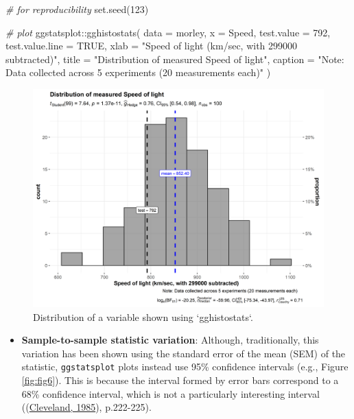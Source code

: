\documentclass[
]{article}
\newenvironment{Shaded}{\begin{snugshade}}{\end{snugshade}}
\newcommand{\AttributeTok}[1]{\textcolor[rgb]{0.77,0.63,0.00}{#1}}
\newcommand{\CommentTok}[1]{\textcolor[rgb]{0.56,0.35,0.01}{\textit{#1}}}
\newcommand{\ConstantTok}[1]{\textcolor[rgb]{0.00,0.00,0.00}{#1}}
\newcommand{\DecValTok}[1]{\textcolor[rgb]{0.00,0.00,0.81}{#1}}
\newcommand{\FunctionTok}[1]{\textcolor[rgb]{0.00,0.00,0.00}{#1}}
\newcommand{\NormalTok}[1]{#1}
\newcommand{\SpecialCharTok}[1]{\textcolor[rgb]{0.00,0.00,0.00}{#1}}
\newcommand{\StringTok}[1]{\textcolor[rgb]{0.31,0.60,0.02}{#1}}
\providecommand{\tightlist}{%
  \setlength{\itemsep}{0pt}\setlength{\parskip}{0pt}}
\begin{document}
\begin{Shaded}
\begin{Highlighting}[]
\CommentTok{\# for reproducibility}
\FunctionTok{set.seed}\NormalTok{(}\DecValTok{123}\NormalTok{)}

\CommentTok{\# plot}
\NormalTok{ggstatsplot}\SpecialCharTok{::}\FunctionTok{gghistostats}\NormalTok{(}
  \AttributeTok{data =}\NormalTok{ morley,}
  \AttributeTok{x =}\NormalTok{ Speed,}
  \AttributeTok{test.value =} \DecValTok{792}\NormalTok{,}
  \AttributeTok{test.value.line =} \ConstantTok{TRUE}\NormalTok{,}
  \AttributeTok{xlab =} \StringTok{"Speed of light (km/sec, with 299000 subtracted)"}\NormalTok{,}
  \AttributeTok{title =} \StringTok{"Distribution of measured Speed of light"}\NormalTok{,}
  \AttributeTok{caption =} \StringTok{"Note: Data collected across 5 experiments (20 measurements each)"}
\NormalTok{)}
\end{Highlighting}
\end{Shaded}

\begin{figure}[H]
\includegraphics[width=1\linewidth]{./figures/paper-fig5-1} \caption{Distribution of a variable shown using `gghistostats`.}\label{fig:fig5}
\end{figure}

\begin{itemize}
\tightlist
\item
  \textbf{Sample-to-sample statistic variation}: Although, traditionally, this
  variation has been shown using the standard error of the mean (SEM) of the
  statistic, \texttt{ggstatsplot} plots instead use 95\% confidence intervals (e.g.,
  Figure \ref{fig:fig6}). This is because the interval formed by error bars
  correspond to a 68\% confidence interval, which is not a particularly
  interesting interval ((\protect\hyperlink{ref-clevelandElementsGraphingData1985}{Cleveland, 1985}), p.222-225).
\end{itemize}
\end{document}
